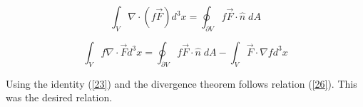 \documentclass[oneside]{book}
\begin{document}
\begin{equation}
\label{25} \int_V \nabla \cdot (f \vec{F})d^3 x  = \oint_{\partial V} f \vec{F}  \cdot \hat{n}\; dA 
\end{equation}

\begin{equation}
\label{26} \int_V f \nabla \cdot \vec{F} d^3 x = \oint_{\partial V} f \vec{F}  \cdot \hat{n}\; dA   - \int_V \vec{F} \cdot \nabla f d^3 x 
\end{equation}

Using the identity (\ref{23}) and the divergence theorem follows relation (\ref{26}). This was the desired relation.
\end{document}
